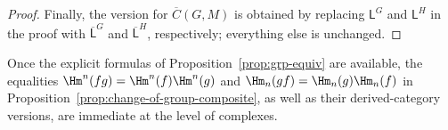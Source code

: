 \begin{proof}
	Finally, the version for $\overline{C}(G,M)$ is obtained by replacing
	$\mathsf{L}^G$ and $\mathsf{L}^H$ in the proof with
	$\overline{\mathsf{L}}^G$ and $\overline{\mathsf{L}}^H$, respectively;
	everything else is unchanged.
\end{proof}

Once the explicit formulas of Proposition~\ref{prop:grp-equiv} are available,
the equalities $\Hm^n(fg)=\Hm^n(f)\Hm^n(g)$ and
$\Hm_n(gf)=\Hm_n(g)\Hm_n(f)$ in
Proposition~\ref{prop:change-of-group-composite}, as well as their
derived-category versions, are immediate at the level of complexes.
